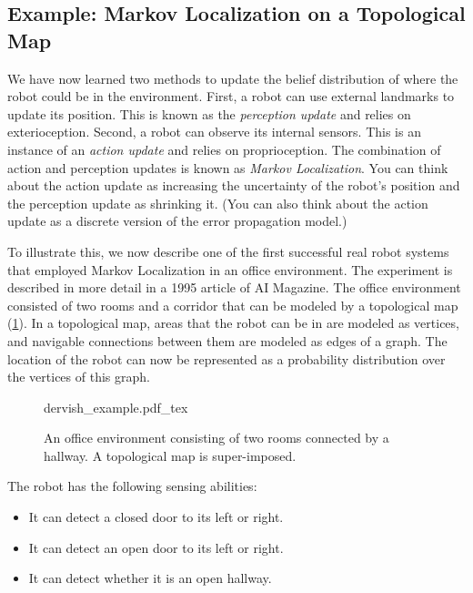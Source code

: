 \subsection{Example: Markov Localization on a Topological Map}
We have now learned two methods to update the belief distribution of where the robot could be in the environment. First, a robot can use external landmarks to update its position. This is known as the \textsl{perception update} and relies on exterioception. Second, a robot can observe its internal sensors. This is an instance of an \textsl{action update} and relies on proprioception. The combination of action and perception updates is known as \textsl{Markov Localization}. You can think about the action update as increasing the uncertainty of the robot's position and the perception update as shrinking it. (You can also think about the action update as a discrete version of the error propagation model.) %

To illustrate this, we now describe one of the first successful real robot systems that employed Markov Localization in an office environment. The experiment is described in more detail in a 1995 article of AI Magazine\cite{nourbakhsh1995dervish}. The office environment consisted of two rooms and a corridor that can be modeled by a topological map (\cref{fig:dervish_example}). In a topological map, areas that the robot can be in are modeled as vertices, and navigable connections between them are modeled as edges of a graph. The location of the robot can now be represented as a probability distribution over the vertices of  this graph.

\begin{figure}
	\centering
    \def\svgwidth{\textwidth}
    {dervish_example.pdf_tex}
	\caption{An office environment consisting of two rooms connected by a hallway. A topological map is super-imposed.
	\label{fig:dervish_example}}
\end{figure}

The robot has the following sensing abilities:
\begin{itemize}
    \item It can detect a closed door to its left or right.
    \item It can detect an open door to its left or right.
    \item It can detect whether it is an open hallway.
\end{itemize}

